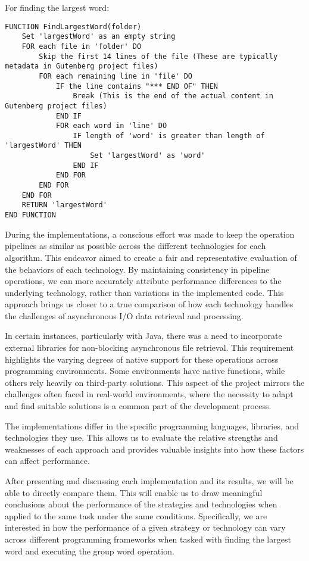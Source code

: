 For finding the largest word:


\begin{verbatim}
FUNCTION FindLargestWord(folder)
    Set 'largestWord' as an empty string
    FOR each file in 'folder' DO
        Skip the first 14 lines of the file (These are typically metadata in Gutenberg project files)
        FOR each remaining line in 'file' DO
            IF the line contains "*** END OF" THEN
                Break (This is the end of the actual content in Gutenberg project files)
            END IF
            FOR each word in 'line' DO
                IF length of 'word' is greater than length of 'largestWord' THEN
                    Set 'largestWord' as 'word'
                END IF
            END FOR
        END FOR
    END FOR
    RETURN 'largestWord'
END FUNCTION
\end{verbatim}

During the implementations, a conscious effort was made to keep the operation pipelines as similar as possible across the different technologies for each algorithm. This endeavor aimed to create a fair and representative evaluation of the behaviors of each technology. By maintaining consistency in pipeline operations, we can more accurately attribute performance differences to the underlying technology, rather than variations in the implemented code. This approach brings us closer to a true comparison of how each technology handles the challenges of asynchronous I/O data retrieval and processing.

In certain instances, particularly with Java, there was a need to incorporate external libraries for non-blocking asynchronous file retrieval. This requirement highlights the varying degrees of native support for these operations across programming environments. Some environments have native functions, while others rely heavily on third-party solutions. This aspect of the project mirrors the challenges often faced in real-world environments, where the necessity to adapt and find suitable solutions is a common part of the development process.

The implementations differ in the specific programming languages, libraries, and technologies they use. This allows us to evaluate the relative strengths and weaknesses of each approach and provides valuable insights into how these factors can affect performance.

After presenting and discussing each implementation and its results, we will be able to directly compare them. This will enable us to draw meaningful conclusions about the performance of the strategies and technologies when applied to the same task under the same conditions. Specifically, we are interested in how the performance of a given strategy or technology can vary across different programming frameworks when tasked with finding the largest word and executing the group word operation.

